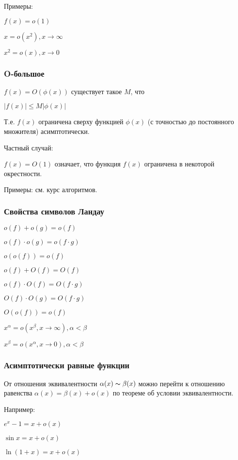 Примеры:

$ f(x) = o( 1 ) $

$ x = o( x^2 ), x\to \infty $

$ x^2 = o( x ), x\to 0 $

\subsubsection{O-большое}

$ f(x) = O( \phi(x) ) $ существует такое $ M $, что

$ |f(x)| \le M| \phi(x) | $

Т.е. $ f(x) $ ограничена сверху функцией $ \phi(x) $
(с точностью до постоянного множителя) асимптотически.

Частный случай:

$ f(x) = O( 1 ) $ означает, что функция $ f(x) $ ограничена в некоторой окрестности.

Примеры: см. курс алгоритмов.

\subsubsection{Свойства символов Ландау}

$o(f)+o(g) = o(f)$

$o(f) \cdot o(g) = o(f \cdot g)$

$o(o(f)) = o(f)$

$o(f)+O(f) = O(f)$

$o(f) \cdot O(f) = O(f \cdot g)$

$O(f) \cdot O(g) = O(f \cdot g)$

$O(o(f)) = o(f)$ 

$x^{\alpha} = o(x^{\beta}, x\to \infty ), \alpha < \beta $ 

$x^{\beta} = o(x^{\alpha}, x\to 0 ), \alpha < \beta$ 

\subsubsection{Асимптотически равные функции}

От отношения эквивалентности $ \alpha(x) \thicksim \beta(x) $ 
можно перейти к отношению равенства $ \alpha(x) = \beta(x) + o(x) $
по теореме об условии эквивалентности.

Например:

$ e^x - 1 = x + o(x) $

$ \sin{x} = x + o(x) $

$ \ln(1+x) = x + o(x) $